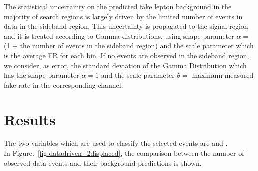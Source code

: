 The statistical uncertainty on the predicted fake lepton background
in the majority of search regions is largely driven by the limited
number of events in data in the sideband region. This uncertainty
is propagated to the signal region and it is treated according to Gamma-distributions, using shape parameter $\alpha =$ (1 +  the number of events in the sideband region) and the scale parameter which is the average FR for each bin.
If no events are observed in the sideband region, we consider, as error, the standard deviation of the Gamma Distribution which has the shape parameter $\alpha = 1$ and the scale parameter $\theta =$ maximum measured fake rate in the corresponding channel.  

\clearpage
\section{Results}\label{sec:llresults}
The two variables which are used to classify the selected events are \Deltwod and
\mtwol.\\
In Figure.~\ref{fig:datadriven_2displaced},
the comparison between the number of observed data events and their background
predictions is shown.


